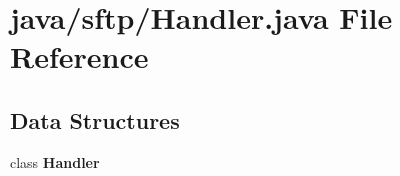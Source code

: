 \section{java/sftp/\+Handler.java File Reference}
\label{Handler_8java}
\subsection*{Data Structures}
\begin{DoxyCompactItemize}
\item 
class {\bf Handler}
\end{DoxyCompactItemize}
